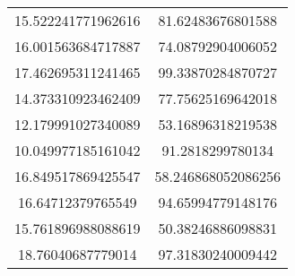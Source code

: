 \begin{table}
\begin{tabular}{cc}
15.522241771962616 & 81.62483676801588 \\
16.001563684717887 & 74.08792904006052 \\
17.462695311241465 & 99.33870284870727 \\
14.373310923462409 & 77.75625169642018 \\
12.179991027340089 & 53.16896318219538 \\
10.049977185161042 & 91.2818299780134 \\
16.849517869425547 & 58.246868052086256 \\
16.64712379765549 & 94.65994779148176 \\
15.761896988088619 & 50.38246886098831 \\
18.76040687779014 & 97.31830240009442 \\
\end{tabular}
\end{table}
